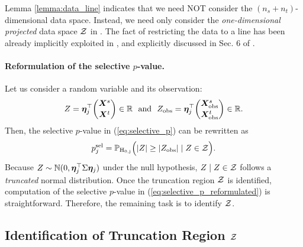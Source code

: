 \begin{remark}
Lemma \ref{lemma:data_line} indicates that we need NOT consider the $(n_s + n_t)$-dimensional data space.
%
Instead, we need only consider the \emph{one-dimensional projected} data space ${\mathcal Z}$ in .
%
The fact of restricting the data to a line has been already implicitly exploited in \cite{lee2016exact}, and explicitly discussed in Sec. 6 of \cite{liu2018more}.
\end{remark}

\paragraph{Reformulation of the selective $p$-value.}
Let us consider a random variable and its observation:
%
\begin{align*}
	Z = \bm \eta_j^\top {\bm X^s \choose \bm X^t } \in \mathbb{R} 
	~~ \text{and} ~~ 
	Z_{\rm obs} = \bm \eta_j^\top {\bm X^s_{\rm obs} \choose \bm X^t_{\rm obs} } \in \mathbb{R}.
\end{align*}
%
%
%
Then, the selective $p$-value in (\ref{eq:selective_p}) can be rewritten as 
%
\begin{align} \label{eq:selective_p_reformulated}
	p^{\rm sel}_j = \mathbb{P}_{\rm H_{0, j}} \Big ( |Z| \geq |Z_{\rm obs}| \mid  Z \in {\mathcal Z} \Big ).
\end{align}
%
Because $Z \sim \mathbb{N}(0, \bm \eta_j^\top \Sigma \bm \eta_j)$ under the null hypothesis, $Z \mid Z \in {\mathcal Z}$ follows a \emph{truncated} normal distribution. 
%
Once the truncation region ${\mathcal Z}$ is identified, computation of the selective $p$-value in (\ref{eq:selective_p_reformulated}) is straightforward.
%
Therefore, the remaining task is to identify ${\mathcal Z}$.



\subsection{Identification of Truncation Region ${\mathcal Z}$} \label{subsec:identification_cZ}

